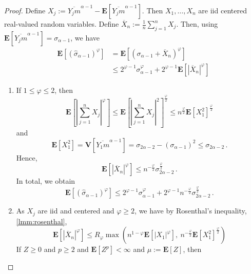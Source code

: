 \documentclass{article}
\newcommand{\lab}{\left[} %
\newcommand{\rab}{\right]} %
\newcommand{\ab}[1]{\lab #1 \rab} %
\newcommand{\abOf}[1]{\!\ab{#1}} %
\newcommand{\lb}{\left(} %
\newcommand{\rb}{\right)} %
\newcommand{\br}[1]{\lb #1 \rb} %
\newcommand{\brOf}[1]{\!\br{#1}} %
\newcommand{\absOf}[1]{\left\vert #1 \right\vert} %
\newcommand{\E}{\mathbf{E}} %
\newcommand{\Eof}[1]{\E[#1]}
\newcommand{\EOf}[1]{\E\abOf{#1}}
\newcommand{\V}{\mathbf{V}} %
\newcommand{\VOf}[1]{\V\abOf{#1}}
\newcommand{\eqfs}{\,.}
\newcommand{\ol}[2]{\overline{#1#2}}
\begin{document}
\begin{proof}
	Define $X_j := \ol{Y_j}{m}^{\alpha-1} - \Eof{\ol{Y_j}{m}^{\alpha-1}}$. Then $X_1, \dots, X_n$ are iid centered real-valued random variables.
	Define $\overline{X}_n := \frac1n \sum_{j=1}^n X_j$.
	Then, using $\Eof{\ol{Y_j}{m}^{\alpha-1}} = \sigma_{\alpha-1}$, we have
	\begin{align}
		\EOf{\br{\hat\sigma_{\alpha-1}}^{\varphi}}
		&=
		\EOf{\br{\sigma_{\alpha-1} + \overline{X}_n}^{\varphi}}
		\\&\leq 
		2^{\varphi-1} \sigma_{\alpha-1}^{\varphi} + 2^{\varphi-1} \EOf{\absOf{\overline{X}_n}^{\varphi}}
	\end{align}
	\begin{enumerate}[label=(\roman*)]
			\item
			If $1 \leq \varphi \leq 2$, then
			\begin{equation}
				\EOf{\absOf{\sum_{j=1}^n X_j}^\varphi}
				\leq
				\EOf{{\absOf{\sum_{j=1}^nX_j}^2}}^{\frac{\varphi}{2}}
				\leq
				n^{\frac{\varphi}{2}} \EOf{X_1^2}^{\frac{\varphi}{2}}
			\end{equation}
			and
			\begin{equation}
				\EOf{X_1^2}
				= 
				\VOf{\ol{Y_1}{m}^{\alpha-1}}
				=
				\sigma_{2\alpha-2} - (\sigma_{\alpha-1})^2
                \leq
                \sigma_{2\alpha-2}
				\eqfs
			\end{equation}
			Hence,
			\begin{equation}
				\EOf{\absOf{\overline{X}_n}^{\varphi}}
				\leq
                n^{-\frac{\varphi}{2}} \sigma_{2\alpha-2}^{\frac{\varphi}{2}}
				\eqfs
			\end{equation}
			In total, we obtain
			\begin{equation}
				\EOf{\br{\hat\sigma_{\alpha-1}}^{\varphi}} 
				\leq 
				2^{\varphi-1} \sigma_{\alpha-1}^{\varphi} + 2^{\varphi-1} n^{-\frac{\varphi}{2}} \sigma_{2\alpha-2}^{\frac{\varphi}{2}}
				\eqfs
			\end{equation}
		\item
			As $X_j$ are iid and centered and $\varphi \geq 2$, we have by Rosenthal's inequality, \cref{lmm:rosenthal},
            \begin{equation}
                \EOf{\absOf{\overline{X}_n}^\varphi} \leq R_\varphi \max\brOf{ n^{1-\varphi} \EOf{|X_1|^\varphi},\ n^{-\frac{\varphi}{2}} \EOf{X_1^2}^{\frac{\varphi}{2}}}
            \end{equation}
			If $Z \geq 0$ and $p\geq 2$ and $\Eof{Z^p} <\infty$ and $\mu := \Eof{Z}$, then
			\begin{equation}

\end{equation}
\end{enumerate}
\end{proof}
\end{document}
